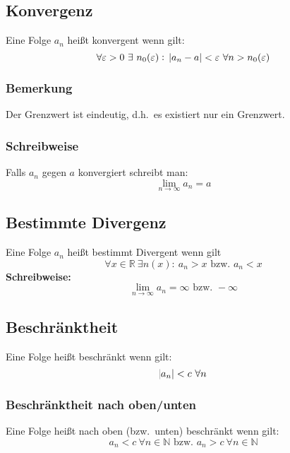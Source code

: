 \subsection{Konvergenz}
Eine Folge $a_n$ heißt konvergent wenn gilt:
\begin{equation*}
    \forall \varepsilon>0\ \exists~n_0(\varepsilon):\ \abs{a_n - a} < \varepsilon\ \forall n > n_0(\varepsilon)
\end{equation*}

\subsubsection{Bemerkung}
Der Grenzwert ist eindeutig, d.h.\ es existiert nur ein Grenzwert.

\subsubsection{Schreibweise}
Falls $a_n$ gegen $a$ konvergiert schreibt man:
\begin{equation*}
    \lim_{n \rightarrow \infty} a_n = a
\end{equation*}

\subsection{Bestimmte Divergenz}
Eine Folge $a_n$ heißt bestimmt Divergent wenn gilt
\begin{equation*}
    \forall x \in \mathbb{R}\ \exists n(x):\ a_n>x \text{ bzw. } a_n<x
\end{equation*}
\textbf{Schreibweise:}
\begin{equation*}
    \lim_{n \rightarrow \infty} a_n = \infty \text{ bzw. } -\infty
\end{equation*}

\subsection{Beschränktheit}
Eine Folge heißt beschränkt wenn gilt:
\begin{equation*}
    \abs{a_n} < c\ \forall n
\end{equation*}

\subsubsection{Beschränktheit nach oben/unten}
Eine Folge heißt nach oben (bzw.~unten) beschränkt wenn gilt:
\begin{equation*}
    a_n < c\ \forall n \in \mathbb{N} \text{ bzw. }a_n > c\ \forall n \in \mathbb{N}
\end{equation*}

